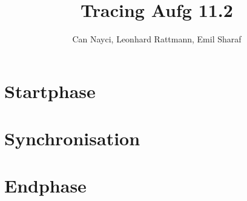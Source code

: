 \documentclass[a4paper,10pt]{article}
\title{Tracing Aufg 11.2}
\author{Can Nayci, Leonhard Rattmann, Emil Sharaf}
\begin{document}
\maketitle

\section{Startphase}
\section{Synchronisation}
\section{Endphase}
\end{document}
